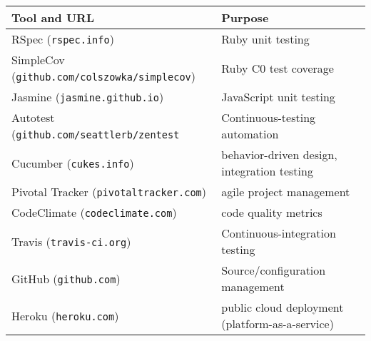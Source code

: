 {\small
\begin{tabular}{|l|l|}
\hline
\textbf{Tool and URL} & \textbf{Purpose} \\ \hline

RSpec (\texttt{rspec.info}) & Ruby unit testing 
\\
SimpleCov (\texttt{github.com/colszowka/simplecov}) & Ruby C0 test coverage
\\

Jasmine (\texttt{jasmine.github.io}) & JavaScript unit testing
\\
Autotest (\texttt{github.com/seattlerb/zentest} & Continuous-testing
automation 
\\

Cucumber (\texttt{cukes.info}) & behavior-driven design, integration
testing
\\
Pivotal Tracker (\texttt{pivotaltracker.com}) & agile project management
\\

CodeClimate (\texttt{codeclimate.com}) & code quality metrics
\\
Travis (\texttt{travis-ci.org}) & Continuous-integration testing
\\

GitHub (\texttt{github.com}) & Source/configuration management
\\
Heroku (\texttt{heroku.com}) & public cloud deployment
(platform-as-a-service)
\\

\hline
\end{tabular}
}

